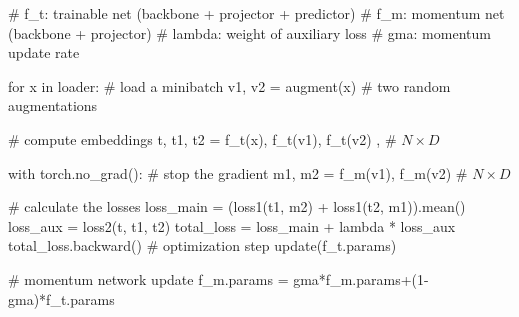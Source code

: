 \begin{algorithm}[!htbp]
\caption{Representation learning with RLPL} \label{alg:bywl}
\begin{algorithmic}
\State \textcolor{pythoncomment}{\# f\_t: trainable net (backbone + projector + predictor)}
\State \textcolor{pythoncomment}{\# f\_m: momentum net (backbone + projector)}
\State \textcolor{pythoncomment}{\# lambda: weight of auxiliary loss}
\State \textcolor{pythoncomment}{\# gma: momentum update rate}

\State \text{}
\State  \textcolor{pythonfunction}{for} x \textcolor{pythonfunction}{in} loader: \textcolor{pythoncomment}{\# load a minibatch}
\State \hspace{1.1em} v1, v2 = augment(x) \textcolor{pythoncomment}{\# two random augmentations}

\State \text{}

\State \hspace{1.1em} \textcolor{pythoncomment}{\# compute embeddings}
\State \hspace{1.1em}	t, t1, t2 = f\_t(x), f\_t(v1), f\_t(v2)  , \textcolor{pythoncomment}{\# $N \times D$}

\State \text{}

\State \hspace{1.1em}	\textcolor{purpleish}{with} torch.no\_grad(): \textcolor{pythoncomment}{\# stop the gradient}
\State \hspace{2.5em}	m1, m2 = f\_m(v1), f\_m(v2) \textcolor{pythoncomment} {\# $N \times D$}

\State \text{}

\State \hspace{1.1em} \textcolor{pythoncomment}{\# calculate the losses}
\State \hspace{1.1em}	loss\_main = (loss1(t1, m2) + loss1(t2, m1)).mean()
\State \hspace{1.1em} loss\_aux = loss2(t, t1, t2)
\State \hspace{1.1em}	total\_loss = loss\_main + lambda * loss\_aux
\State \hspace{1.1em} total\_loss.backward() \textcolor{pythoncomment}{\# optimization step}
\State \hspace{1.1em} update(f\_t.params)

\State \text{}

\State \hspace{1.1em} \textcolor{pythoncomment}{\# momentum network update}
\State \hspace{1.1em} f\_m.params = gma*f\_m.params+(1-gma)*f\_t.params


\end{algorithmic}
\end{algorithm}

